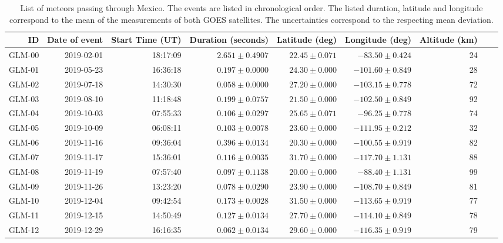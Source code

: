 \begin{table}
  \centering
  \footnotesize
  \caption{List of meteors passing through Mexico. The events are listed in chronological order. The listed duration, latitude and longitude correspond to the mean of the measurements of both GOES satellites. The uncertainties correspond to the respecting mean deviation.}
\label{tab:table-meteors}
\begin{tabular}{rrrrrrrrr}
\hline
ID & Date of event  & Start Time (UT)  & Duration (seconds) & Latitude (deg) & Longitude (deg)& Altitude (km)\\\hline
GLM-00 & 2019-02-01 & 18:17:09 & $2.651\pm 0.4907$ & $22.45 \pm 0.071$ & $-83.50  \pm  0.424$ & 24           \\         
GLM-01 & 2019-05-23 & 16:36:18 & $0.197\pm 0.0000$ & $24.30 \pm 0.000$ & $-101.60 \pm  0.849$ & 28           \\
GLM-02 & 2019-07-18 & 14:30:30 & $0.058\pm 0.0000$ & $27.20 \pm 0.000$ & $-103.15 \pm  0.778$ & 72           \\
GLM-03 & 2019-08-10 & 11:18:48 & $0.199\pm 0.0757$ & $21.50 \pm 0.000$ & $-102.50  \pm 0.849$ & 92           \\
GLM-04 & 2019-10-03 & 07:55:33 & $0.106\pm 0.0297$ & $25.65 \pm 0.071$ & $-96.25 \pm   0.778$ & 74           \\
GLM-05 & 2019-10-09 & 06:08:11 & $0.103\pm 0.0078$ & $23.60 \pm 0.000$ & $-111.95 \pm  0.212$ & 32           \\
GLM-06 & 2019-11-16 & 09:36:04 & $0.396\pm 0.0134$ & $20.30 \pm 0.000$ & $-100.55 \pm  0.919$ & 82           \\
GLM-07 & 2019-11-17 & 15:36:01 & $0.116\pm 0.0035$ & $31.70 \pm 0.000$ & $-117.70 \pm  1.131$ & 88           \\
GLM-08 & 2019-11-19 & 07:57:40 & $0.097\pm 0.1138$ & $20.00 \pm 0.000$ & $-88.40 \pm   1.131$ & 99           \\
GLM-09 & 2019-11-26 & 13:23:20 & $0.078\pm 0.0290$ & $23.90 \pm 0.000$ & $-108.70 \pm  0.849$ & 81           \\
GLM-10 & 2019-12-04 & 09:42:54 & $0.173\pm 0.0028$ & $31.50 \pm 0.000$ & $-113.65 \pm  0.919$ & 77           \\
GLM-11 & 2019-12-15 & 14:50:49 & $0.127\pm 0.0134$ & $27.70 \pm 0.000$ & $-114.10 \pm  0.849$ & 78           \\
GLM-12 & 2019-12-29 & 16:16:35 & $0.062\pm 0.0134$ & $29.60 \pm 0.000$ & $-116.35 \pm  0.919$ & 79           \\

\end{tabular}
\end{table}
